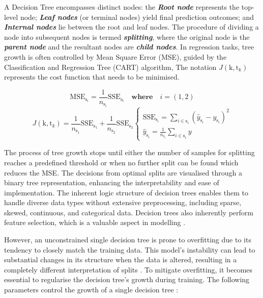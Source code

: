 \documentclass[]{interact}
\theoremstyle{plain}%
\theoremstyle{definition}
\theoremstyle{remark}
\begin{document}
A Decision Tree encompasses distinct nodes: the \textbf{\emph{Root node}} represents the top-level node; \textbf{\emph{Leaf nodes}} (or terminal nodes) yield final prediction outcomes; and \textbf{\emph{Internal nodes}} lie between the root and leaf nodes. The procedure of dividing a node into subsequent nodes is termed \textbf{\emph{splitting}}, where the original node is the \textbf{\emph{parent node}} and the resultant nodes are \textbf{\emph{child nodes}}. In regression tasks, tree growth is often controlled by Mean Square Error (MSE), guided by the Classification and Regression Tree (CART) algorithm, The notation $J(\text{k},\text{t}_k)$ represents the cost function that needs to be minimised.

\begin{equation}\label{eqn:sse}
  \text{MSE}_{\text{s}_i} = \frac{1}{n_{\text{s}_i}}\text{SSE}_{\text{s}_i} \quad \textbf{where} \quad i = (1,2)   
\end{equation}
\begin{equation}\label{eqn:costfun}
  J(\text{k},\text{t}_k) = \frac{1}{n_{\text{s}_1}}\text{SSE}_{\text{s}_1} + \frac{1}{n_{\text{s}_2}}\text{SSE}_{\text{s}_2}
  \begin{cases}
      \text{SSE}_{\text{s}_i} = \sum\limits_{i \in \text{s}_i}(\hat{y}_{\text{s}_i} - y_{\text{s}_i} )^2 \\
      \hat{y}_{\text{s}_i} = \frac{1}{n_{\text{s}_i}}\sum\limits_{i\in \text{s}_i} y
  \end{cases}  
\end{equation}

The process of tree growth stops until either the number of samples for splitting reaches a predefined threshold or when no further split can be found which reduces the MSE. The decisions from optimal splits are visualised through a binary tree representation, enhancing the interpretability and ease of implementation. The inherent logic structure of decision trees enables them to handle diverse data types without extensive preprocessing, including sparse, skewed, continuous, and categorical data. Decision trees also inherently perform feature selection, which is a valuable aspect in modelling \citep{Kuhn.2013}.

However, an unconstrained single decision tree is prone to overfitting due to its tendency to closely match the training data. This model's instability can lead to substantial changes in its structure when the data is altered, resulting in a completely different interpretation of splits \citep{Hastie.2009, Kuhn.2013}. To mitigate overfitting, it becomes essential to regularise the decision tree's growth during training. The following parameters control the growth of a single decision tree : 
\end{document}
